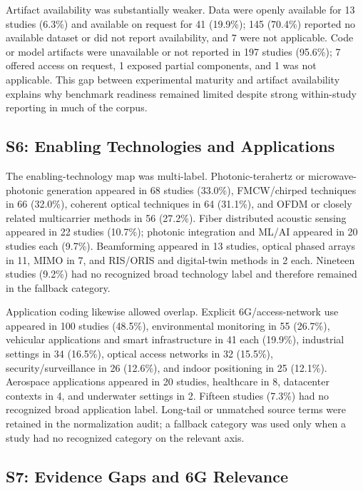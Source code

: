 Artifact availability was substantially weaker. Data were openly available
for 13 studies (6.3\%) and available on request for 41 (19.9\%); 145 (70.4\%)
reported no available dataset or did not report availability, and 7 were not
applicable. Code or model artifacts were unavailable or not reported in 197
studies (95.6\%); 7 offered access on request, 1 exposed partial components,
and 1 was not applicable. This gap between experimental maturity and artifact
availability explains why benchmark readiness remained limited despite strong
within-study reporting in much of the corpus.

\subsection{S6: Enabling Technologies and Applications}

The enabling-technology map was multi-label. Photonic-terahertz or
microwave-photonic generation appeared in 68 studies (33.0\%), FMCW/chirped
techniques in 66 (32.0\%), coherent optical techniques in 64 (31.1\%), and
OFDM or closely related multicarrier methods in 56 (27.2\%). Fiber distributed
acoustic sensing appeared in 22 studies (10.7\%); photonic integration and
ML/AI appeared in 20 studies each (9.7\%). Beamforming appeared in 13 studies,
optical phased arrays in 11, MIMO in 7, and RIS/ORIS and digital-twin methods
in 2 each. Nineteen studies (9.2\%) had no recognized broad technology label
and therefore remained in the fallback category.

Application coding likewise allowed overlap. Explicit 6G/access-network use
appeared in 100 studies (48.5\%), environmental monitoring in 55 (26.7\%),
vehicular applications and smart infrastructure in 41 each (19.9\%),
industrial settings in 34 (16.5\%), optical access networks in 32 (15.5\%),
security/surveillance in 26 (12.6\%), and indoor positioning in 25 (12.1\%).
Aerospace applications appeared in 20 studies, healthcare in 8, datacenter
contexts in 4, and underwater settings in 2. Fifteen studies (7.3\%) had no
recognized broad application label. Long-tail or unmatched source terms were
retained in the normalization audit; a fallback category was used only when a
study had no recognized category on the relevant axis.

\subsection{S7: Evidence Gaps and 6G Relevance}

